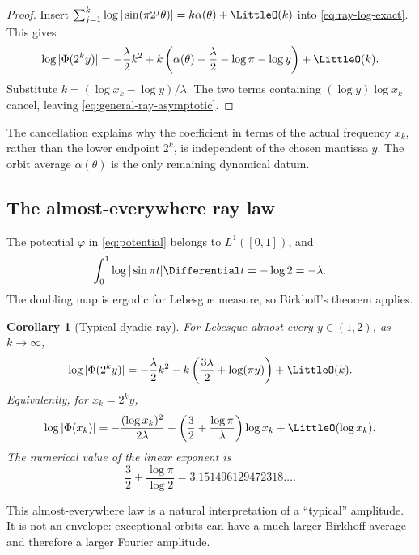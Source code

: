 \documentclass[11pt,oneside]{article}
\newtheorem{corollary}[corollary]{Corollary}
\theoremstyle{definition}
\theoremstyle{remark}
\newcommand{\PhiF}{\Phi}
\begin{document}
\begin{proof}
Insert
\(
 \sum_{j=1}^{k}\log|\sin(\pi2^j\theta)|
 =k\alpha(\theta)+\LittleO(k)
\)
into \eqref{eq:ray-log-exact}.  This gives
\[
 \log|\PhiF(2^k y)|
 =-\frac{\lambda}{2}k^2
 +k\left(\alpha(\theta)-\frac\lambda2-\log\pi-\log y\right)
 +\LittleO(k).
\]
Substitute \(k=(\log x_k-\log y)/\lambda\).  The two terms containing
\((\log y)\log x_k\) cancel, leaving \eqref{eq:general-ray-asymptotic}.
\end{proof}

The cancellation explains why the coefficient in terms of the actual
frequency \(x_k\), rather than the lower endpoint \(2^k\), is independent of
the chosen mantissa \(y\).  The orbit average \(\alpha(\theta)\) is the only
remaining dynamical datum.

\subsection{The almost-everywhere ray law}

The potential \(\varphi\) in \eqref{eq:potential} belongs to \(L^1([0,1])\),
and
\begin{equation}
 \int_0^1\log|\sin\pi t|\Differential t=-\log2=-\lambda.
 \label{eq:log-sine-integral}
\end{equation}
The doubling map is ergodic for Lebesgue measure, so Birkhoff's theorem applies.

\begin{corollary}[Typical dyadic ray]
\label{cor:typical-ray}
For Lebesgue-almost every \(y\in(1,2)\), as \(k\to\infty\),
\begin{equation}
 \log|\PhiF(2^k y)|
 =-\frac{\lambda}{2}k^2
 -k\left(\frac{3\lambda}{2}+\log(\pi y)\right)
 +\LittleO(k).
 \label{eq:typical-k}
\end{equation}
Equivalently, for \(x_k=2^k y\),
\begin{equation}
 \log|\PhiF(x_k)|
 =-\frac{(\log x_k)^2}{2\lambda}
 -\left(\frac32+\frac{\log\pi}{\lambda}\right)\log x_k
 +\LittleO(\log x_k).
 \label{eq:typical-x}
\end{equation}
The numerical value of the linear exponent is
\[
 \frac32+\frac{\log\pi}{\log2}
 =3.151496129472318\ldots.
\]
\end{corollary}

This almost-everywhere law is a natural interpretation of a ``typical''
amplitude.  It is not an envelope: exceptional orbits can have a much larger
Birkhoff average and therefore a larger Fourier amplitude.
\end{document}
